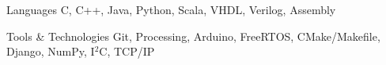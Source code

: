 
\begin{cvskills}
  \cvskill
    {Languages} %
    {C, C++, Java, Python, Scala, VHDL, Verilog, Assembly} %

  \cvskill
    {Tools \& Technologies} %
    {Git, Processing, Arduino, FreeRTOS, CMake/Makefile, Django, NumPy, I$^2$C, TCP/IP} %
  
\end{cvskills}
